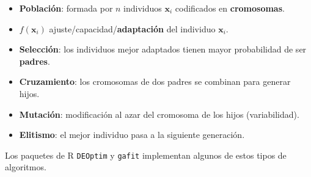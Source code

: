 \documentclass[
]{book}
\theoremstyle{break}
\theoremstyle{nonumberplain}
\begin{document}
\begin{itemize}
\item
  \textbf{Población}: formada por \(n\) individuos \(\mathbf{x}_i\)
  codificados en \textbf{cromosomas}.
\item
  \(f(\mathbf{x}_i)\) ajuste/capacidad/\textbf{adaptación} del
  individuo \(\mathbf{x}_i\).
\item
  \textbf{Selección}: los individuos mejor adaptados tienen mayor
  probabilidad de ser \textbf{padres}.
\item
  \textbf{Cruzamiento}: los cromosomas de dos padres se combinan para
  generar hijos.
\item
  \textbf{Mutación}: modificación al azar del cromosoma de los
  hijos (variabilidad).
\item
  \textbf{Elitismo}: el mejor individuo pasa a la siguiente generación.
\end{itemize}

Los paquetes de R \texttt{DEOptim} y \texttt{gafit} implementan algunos de estos
tipos de algoritmos.
\end{document}
